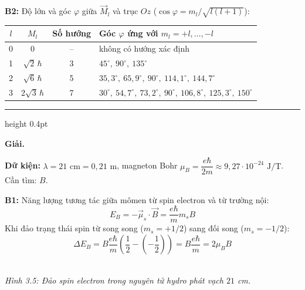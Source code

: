 \documentclass[11pt,a4paper]{article}
\let\DeBaiOriginal\DeBai
\renewcommand{\DeBai}[1]{\par\Needspace{5\baselineskip}\DeBaiOriginal{#1}}
\newcommand{\PhanCachBai}{%
  \par\Needspace{7\baselineskip}%
  \addvspace{6pt}%
  {\color{black!40}\hrule height 0.4pt}%
  \nobreak\vspace{7pt}\nobreak
}
\begin{document}
\textbf{B2:} Độ lớn và góc $\varphi$ giữa $\vec M_l$ và trục $Oz$ ($\cos\varphi=m_l/\sqrt{l(l+1)}$):
\begin{center}
\renewcommand{\arraystretch}{1.25}
\begin{tabular}{cccl}
\hline
$l$ & $M_l$ & Số hướng & Góc $\varphi$ ứng với $m_l=+l,\dots,-l$ \\
\hline
0 & 0 & -- & không có hướng xác định \\
1 & $\sqrt2\,\hbar$ & 3 & $45^\circ,\ 90^\circ,\ 135^\circ$ \\
2 & $\sqrt6\,\hbar$ & 5 & $35{,}3^\circ,\ 65{,}9^\circ,\ 90^\circ,\ 114{,}1^\circ,\ 144{,}7^\circ$ \\
3 & $2\sqrt3\,\hbar$ & 7 & $30^\circ,\ 54{,}7^\circ,\ 73{,}2^\circ,\ 90^\circ,\ 106{,}8^\circ,\ 125{,}3^\circ,\ 150^\circ$ \\
\hline
\end{tabular}
\end{center}

\PhanCachBai


\textbf{Giải.}

\textbf{Dữ kiện:} $\lambda = 21\text{ cm} = 0{,}21\text{ m}$, magneton Bohr $\mu_B = \dfrac{e\hbar}{2m} \approx 9{,}27 \cdot 10^{-24}\text{ J/T}$. Cần tìm: $B$.

\textbf{B1:} Năng lượng tương tác giữa mômen từ spin electron và từ trường nội:
\begin{equation*}
    E_B = -\vec{\mu}_s \cdot \vec{B} = \frac{e\hbar}{m} m_s B
\end{equation*}
Khi đảo trạng thái spin từ song song ($m_s = +1/2$) sang đối song ($m_s = -1/2$):
\begin{equation*}
    \Delta E_B = B \frac{e\hbar}{m}\left(\frac{1}{2} - \left(-\frac{1}{2}\right)\right) = B \frac{e\hbar}{m} = 2 \mu_B B
\end{equation*}

\begin{center}\begin{minipage}{\linewidth}\centering
{}\\[0.1cm]
\textit{Hình 3.5: Đảo spin electron trong nguyên tử hydro phát vạch $21$ cm.}
\end{minipage}\end{center}
\end{document}
